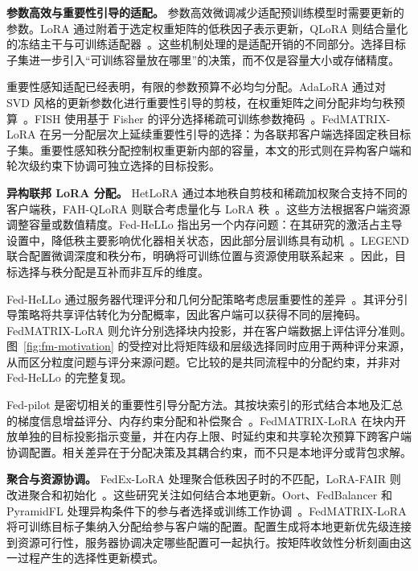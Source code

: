 \noindent\textbf{参数高效与重要性引导的适配。}
参数高效微调减少适配预训练模型时需要更新的参数。LoRA 通过附着于选定权重矩阵的低秩因子表示更新，QLoRA 则结合量化的冻结主干与可训练适配器~\cite{hu2022lora,dettmers2023qlora}。这些机制处理的是适配开销的不同部分。选择目标子集进一步引入“可训练容量放在哪里”的决策，而不仅是容量大小或存储精度。

重要性感知适配已经表明，有限的参数预算不必均匀分配。AdaLoRA 通过对 SVD 风格的更新参数化进行重要性引导的剪枝，在权重矩阵之间分配非均匀秩预算~\cite{fm_adalora2023}。FISH 使用基于 Fisher 的评分选择稀疏可训练参数掩码~\cite{fm_fish2021}。FedMATRIX-LoRA 在另一分配层次上延续重要性引导的选择：为各联邦客户端选择固定秩目标子集。重要性感知秩分配控制权重更新内部的容量，本文的形式则在异构客户端和轮次级约束下协调可独立选择的目标投影。

\noindent\textbf{异构联邦 LoRA 分配。}
HetLoRA 通过本地秩自剪枝和稀疏加权聚合支持不同的客户端秩，FAH-QLoRA 则联合考虑量化与 LoRA 秩~\cite{cho2024hetlora,gao2025fah}。这些方法根据客户端资源调整容量或数值精度。Fed-HeLLo 指出另一个内存问题：在其研究的激活占主导设置中，降低秩主要影响优化器相关状态，因此部分层训练具有动机~\cite{zhang2025fedhello}。LEGEND 联合配置微调深度和秩分布，明确将可训练位置与资源使用联系起来~\cite{liu2025legend}。因此，目标选择与秩分配是互补而非互斥的维度。

Fed-HeLLo 通过服务器代理评分和几何分配策略考虑层重要性的差异~\cite{zhang2025fedhello}。其评分引导策略将共享评估转化为分配概率，因此客户端可以获得不同的层掩码。FedMATRIX-LoRA 则允许分别选择块内投影，并在客户端数据上评估评分准则。图~\ref{fig:fm-motivation} 的受控对比将矩阵级和层级选择同时应用于两种评分来源，从而区分粒度问题与评分来源问题。它比较的是共同流程中的分配约束，并非对 Fed-HeLLo 的完整复现。

Fed-pilot 是密切相关的重要性引导分配方法。其按块索引的形式结合本地及汇总的梯度信息增益评分、内存约束分配和补偿聚合~\cite{fm_fedpilot2025}。FedMATRIX-LoRA 在块内开放单独的目标投影指示变量，并在内存上限、时延约束和共享轮次预算下跨客户端协调配置。相关差异在于分配决策及其耦合约束，而不只是本地评分或背包求解。

\noindent\textbf{聚合与资源协调。}
FedEx-LoRA 处理聚合低秩因子时的不匹配，LoRA-FAIR 则改进聚合和初始化~\cite{singhal2025fedex,bian2025lorafair}。这些研究关注如何结合本地更新。Oort、FedBalancer 和 PyramidFL 处理异构条件下的参与者选择或训练工作协调~\cite{lai2021oort,shin2022fedbalancer,li2022pyramidfl}。FedMATRIX-LoRA 将可训练目标子集纳入分配给参与客户端的配置。配置生成将本地更新优先级连接到资源可行性，服务器协调决定哪些配置可一起执行。按矩阵收敛性分析刻画由这一过程产生的选择性更新模式。
